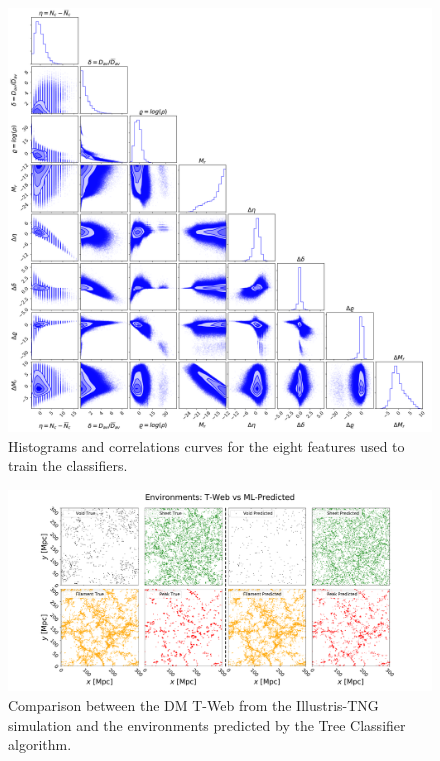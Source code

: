 \documentclass[usenatbib]{mnras}
\begin{document}
\begin{figure}
        \includegraphics[scale=0.3]{Figs/p_all_features_correlations.pdf}
    \caption{Histograms and correlations curves for the eight features
      used to train the classifiers.} 
    \label{fig:features}
\end{figure}


\begin{figure}
  \centering 
    \includegraphics[scale=0.32]{Figs/p_environment_predicted.pdf}
    \caption{Comparison between the DM T-Web from the Illustris-TNG
      simulation and the environments predicted by the Tree Classifier
      algorithm.} 
    \label{fig:prediction}
\end{figure}
\end{document}

